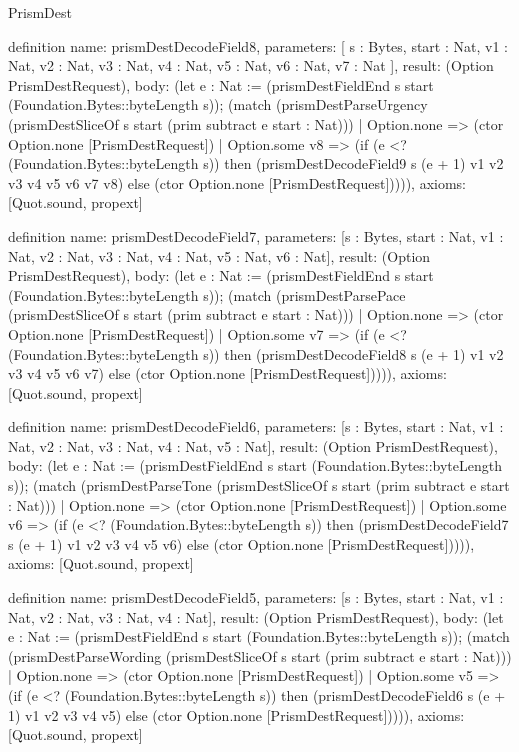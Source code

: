 \begin{lexlean}{PrismDest}
\begin{semanticmodule}
definition{
  name: prismDestDecodeField8,
  parameters: [
    s : Bytes,
    start : Nat,
    v1 : Nat,
    v2 : Nat,
    v3 : Nat,
    v4 : Nat,
    v5 : Nat,
    v6 : Nat,
    v7 : Nat
  ],
  result: (Option PrismDestRequest),
  body: (let e : Nat := (prismDestFieldEnd s start (Foundation.Bytes::byteLength s)); (match (prismDestParseUrgency (prismDestSliceOf s start (prim subtract e start : Nat)))
    | Option.none => (ctor Option.none [PrismDestRequest])
    | Option.some v8 => (if (e <? (Foundation.Bytes::byteLength s)) then (prismDestDecodeField9 s (e + 1) v1 v2 v3 v4 v5 v6 v7 v8) else (ctor Option.none [PrismDestRequest])))),
  axioms: [Quot.sound, propext]
}

definition{
  name: prismDestDecodeField7,
  parameters: [s : Bytes, start : Nat, v1 : Nat, v2 : Nat, v3 : Nat, v4 : Nat, v5 : Nat, v6 : Nat],
  result: (Option PrismDestRequest),
  body: (let e : Nat := (prismDestFieldEnd s start (Foundation.Bytes::byteLength s)); (match (prismDestParsePace (prismDestSliceOf s start (prim subtract e start : Nat)))
    | Option.none => (ctor Option.none [PrismDestRequest])
    | Option.some v7 => (if (e <? (Foundation.Bytes::byteLength s)) then (prismDestDecodeField8 s (e + 1) v1 v2 v3 v4 v5 v6 v7) else (ctor Option.none [PrismDestRequest])))),
  axioms: [Quot.sound, propext]
}

definition{
  name: prismDestDecodeField6,
  parameters: [s : Bytes, start : Nat, v1 : Nat, v2 : Nat, v3 : Nat, v4 : Nat, v5 : Nat],
  result: (Option PrismDestRequest),
  body: (let e : Nat := (prismDestFieldEnd s start (Foundation.Bytes::byteLength s)); (match (prismDestParseTone (prismDestSliceOf s start (prim subtract e start : Nat)))
    | Option.none => (ctor Option.none [PrismDestRequest])
    | Option.some v6 => (if (e <? (Foundation.Bytes::byteLength s)) then (prismDestDecodeField7 s (e + 1) v1 v2 v3 v4 v5 v6) else (ctor Option.none [PrismDestRequest])))),
  axioms: [Quot.sound, propext]
}

definition{
  name: prismDestDecodeField5,
  parameters: [s : Bytes, start : Nat, v1 : Nat, v2 : Nat, v3 : Nat, v4 : Nat],
  result: (Option PrismDestRequest),
  body: (let e : Nat := (prismDestFieldEnd s start (Foundation.Bytes::byteLength s)); (match (prismDestParseWording (prismDestSliceOf s start (prim subtract e start : Nat)))
    | Option.none => (ctor Option.none [PrismDestRequest])
    | Option.some v5 => (if (e <? (Foundation.Bytes::byteLength s)) then (prismDestDecodeField6 s (e + 1) v1 v2 v3 v4 v5) else (ctor Option.none [PrismDestRequest])))),
  axioms: [Quot.sound, propext]
}


\end{semanticmodule}
\end{lexlean}
